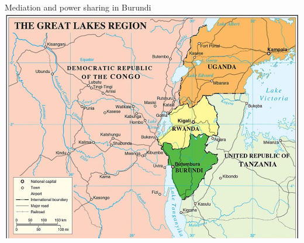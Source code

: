 \documentclass[xcolor=table,usenames,dvipsnames]{beamer}
\begin{document}
\begin{frame}{Mediation and power sharing in Burundi}
\centering
\includegraphics[scale=0.40]{pictures/week24.png} 
\end{frame}

\end{document}

